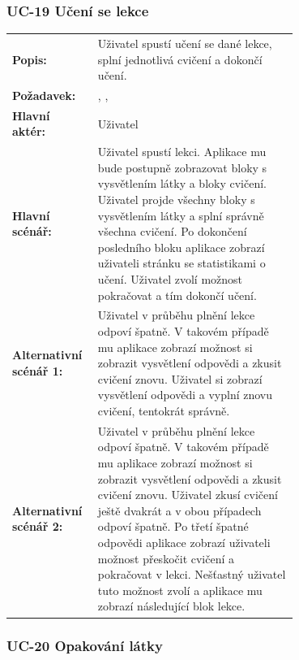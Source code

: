 \subsubsection{UC-19 Učení se lekce}

\begin{tabular}{lp{0.7\linewidth}}
  \textbf{Popis:} & Uživatel spustí učení se dané lekce, splní jednotlivá cvičení a dokončí učení. \\
  \textbf{Požadavek:} & \nameref{sec:fp-learning-structure}, \nameref{sec:fp-exercise-blocks}, \nameref{sec:fp-explanation-blocks} \\
  \textbf{Hlavní aktér:} & Uživatel \\
  \textbf{Hlavní scénář:} & Uživatel spustí lekci. Aplikace mu bude postupně zobrazovat bloky s vysvětlením látky a bloky cvičení. Uživatel projde všechny bloky s vysvětlením látky a splní správně všechna cvičení. Po dokončení posledního bloku aplikace zobrazí uživateli stránku se statistikami o učení. Uživatel zvolí možnost pokračovat a tím dokončí učení. \\
  \textbf{Alternativní scénář 1:} & Uživatel v průběhu plnění lekce odpoví špatně. V takovém případě mu aplikace zobrazí možnost si zobrazit vysvětlení odpovědi a zkusit cvičení znovu. Uživatel si zobrazí vysvětlení odpovědi a vyplní znovu cvičení, tentokrát správně. \\
  \textbf{Alternativní scénář 2:} & Uživatel v průběhu plnění lekce odpoví špatně. V takovém případě mu aplikace zobrazí možnost si zobrazit vysvětlení odpovědi a zkusit cvičení znovu. Uživatel zkusí cvičení ještě dvakrát a v obou případech odpoví špatně. Po třetí špatné odpovědi aplikace zobrazí uživateli možnost přeskočit cvičení a pokračovat v lekci. Nešťastný uživatel tuto možnost zvolí a aplikace mu zobrazí následující blok lekce. \\
\end{tabular}


\subsubsection{UC-20 Opakování látky}

